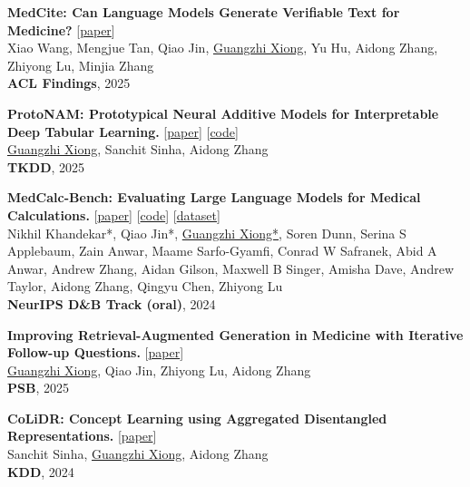 \documentclass[10pt, letterpaper]{article}
\begin{document}
\begin{enumerate}[label={[\arabic*]}]
            \item \textbf{MedCite: Can Language Models Generate Verifiable Text for Medicine?} [\href{https://arxiv.org/abs/2506.06605}{paper}] \\
            Xiao Wang, Mengjue Tan, Qiao Jin, \underline{Guangzhi Xiong}, Yu Hu, Aidong Zhang, Zhiyong Lu, Minjia Zhang \\
            \textbf{ACL Findings}, 2025
            
            \item \textbf{ProtoNAM: Prototypical Neural Additive Models for Interpretable Deep Tabular Learning.} [\href{https://dl.acm.org/doi/10.1145/3766072}{paper}] [\href{https://github.com/gzxiong/ProtoNAM}{code}] \\
            \underline{Guangzhi Xiong}, Sanchit Sinha, Aidong Zhang\\
            \textbf{TKDD}, 2025
            
            \item \textbf{MedCalc-Bench: Evaluating Large Language Models for Medical Calculations.} [\href{https://proceedings.neurips.cc/paper_files/paper/2024/hash/99e81750f3fdfcaf9613db2dbf4bd623-Abstract-Datasets_and_Benchmarks_Track.html}{paper}] [\href{https://github.com/ncbi-nlp/MedCalc-Bench}{code}] [\href{https://huggingface.co/datasets/ncbi/MedCalc-Bench}{dataset}] \\
            Nikhil Khandekar*, Qiao Jin*, \underline{Guangzhi Xiong*}, Soren Dunn, Serina S Applebaum, Zain Anwar, Maame Sarfo-Gyamfi, Conrad W Safranek, Abid A Anwar, Andrew Zhang, Aidan Gilson, Maxwell B Singer, Amisha Dave, Andrew Taylor, Aidong Zhang, Qingyu Chen, Zhiyong Lu\\
            \textbf{NeurIPS D\&B Track (oral)}, 2024

            \item \textbf{Improving Retrieval-Augmented Generation in Medicine with Iterative Follow-up Questions.} [\href{https://arxiv.org/abs/2408.00727}{paper}] \\
            \underline{Guangzhi Xiong}, Qiao Jin, Zhiyong Lu, Aidong Zhang\\
            \textbf{PSB}, 2025

            \item \textbf{CoLiDR: Concept Learning using Aggregated Disentangled Representations.} [\href{https://dl.acm.org/doi/10.1145/3637528.3671938}{paper}] \\
            Sanchit Sinha, \underline{Guangzhi Xiong}, Aidong Zhang \\
            \textbf{KDD}, 2024


\end{enumerate}
\end{document}
